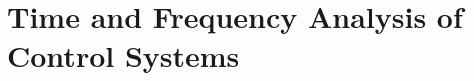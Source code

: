 \documentclass[../course]{subfiles}
\begin{document}
\chapter{Time and Frequency Analysis of Control Systems}


\end{document}
